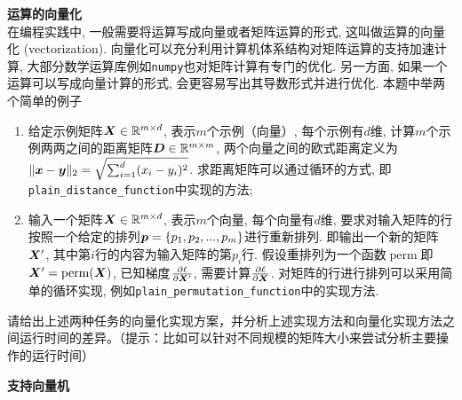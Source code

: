 \documentclass[answers]{exam}  %
\begin{document}
\begin{questions}
\begin{enumerate}
\end{enumerate}


\begin{solution}
\end{solution}

\question [20] \textbf{运算的向量化} \\
在编程实践中, 一般需要将运算写成向量或者矩阵运算的形式, 这叫做运算的向量化 (vectorization).
向量化可以充分利用计算机体系结构对矩阵运算的支持加速计算,
大部分数学运算库例如\lstinline{numpy}也对矩阵计算有专门的优化.
另一方面, 如果一个运算可以写成向量计算的形式, 会更容易写出其导数形式并进行优化.
本题中举两个简单的例子
\begin{enumerate}
    \item 给定示例矩阵$\boldsymbol{X} \in \mathbb{R}^{m\times d}$, 表示$m$个示例（向量）, 每个示例有$d$维,
    计算$m$个示例两两之间的距离矩阵$\boldsymbol{D} \in \mathbb{R}^{m\times m}$,
    两个向量之间的欧式距离定义为$\|{\boldsymbol{x}} - \boldsymbol{y}\|_2=\sqrt{\sum_{i=1}^{d} (x_i - y_i)^2}$.
    求距离矩阵可以通过循环的方式, 即\lstinline{plain_distance_function}中实现的方法;
    
    \item 输入一个矩阵$\boldsymbol{X} \in \mathbb{R}^{m\times d}$, 表示$m$个向量, 每个向量有$d$维,
    要求对输入矩阵的行按照一个给定的排列$\boldsymbol{p}=\{p_{1}, p_{2}, ..., p_m\}$进行重新排列.
    即输出一个新的矩阵$\boldsymbol{X}^\prime$, 其中第$i$行的内容为输入矩阵的第$p_{i}$行.
    假设重排列为一个函数$\operatorname{perm}$即$\boldsymbol{X}^\prime = \operatorname{perm}(\boldsymbol{X})$, 已知梯度$\frac{\partial \ell}{\partial \boldsymbol{X}^\prime}$,
    需要计算$\frac{\partial \ell}{\partial \boldsymbol{X}}$. 对矩阵的行进行排列可以采用简单的循环实现, 例如\lstinline{plain_permutation_function}中的实现方法.
    
\end{enumerate}
请给出上述两种任务的向量化实现方案，并分析上述实现方法和向量化实现方法之间运行时间的差异。（提示：比如可以针对不同规模的矩阵大小来尝试分析主要操作的运行时间）

	\begin{solution}
	\end{solution}


\question [20] \textbf{支持向量机}


\end{questions}
\end{document}
